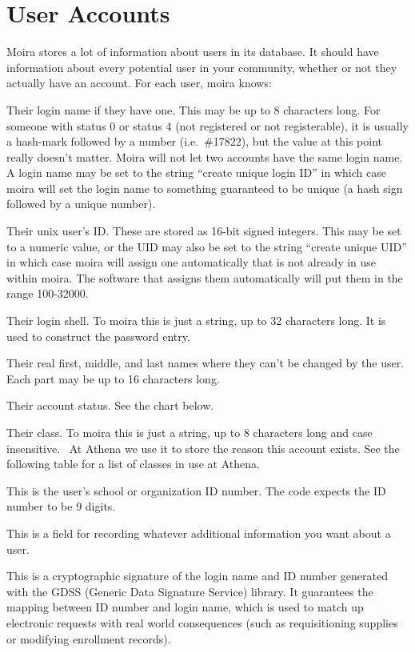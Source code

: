 \section{User Accounts}
Moira stores a lot of information about users in its database.  It
should have information about every potential user in your community,
whether or not they actually have an account.  For each user, moira
knows:
\begin{description}
\item[login] Their login name if they have one.  This may be up to 8
characters long.  For someone with status 0
or status 4 (not registered or not registerable), it is usually a
hash-mark followed by a number (i.e.\ \#17822), but the value at this
point really doesn't matter.  Moira will not let two accounts have the
same login name.  A login name may be set to the string ``create
unique login ID'' in which case moira will set the login name to
something guaranteed to be unique (a hash sign followed by a unique
number).
\item[UID] Their {\sc unix} user's ID.  These are stored as 16-bit signed
integers.  This may be set to a numeric value, or the UID may also be
set to the string ``create unique UID'' in which case moira will
assign one automatically that is not already in use within moira.  The
software that assigns them automatically will put them in the range
100-32000.
\item[shell] Their login shell.  To moira this is just a string, up to 32
characters long.  It is used to construct the password entry.
\item[name] Their real first, middle, and last names where they can't be
changed by the user.  Each part may be up to 16 characters long.
\item[status] Their account status.  See the chart below.
\item[class] Their class.  To moira this is just a string, up to 8
characters long and case insensitive.  \athena\ At Athena we
use it to store the reason this account exists.  See the following
table for a list of classes in use at Athena.
\item[ID number] This is the user's school or organization ID
number.  The code expects the ID number to be 9 digits.
\item[comment] This is a field for recording whatever additional
information you want about a user.
\item[signature] This is a cryptographic signature of the login name
and ID number generated with the GDSS (Generic Data Signature Service)
library.  It guarantees the mapping between ID number and login name,
which is used to match up electronic requests with real world
consequences (such as requisitioning supplies or modifying enrollment
records).
\end{description}

